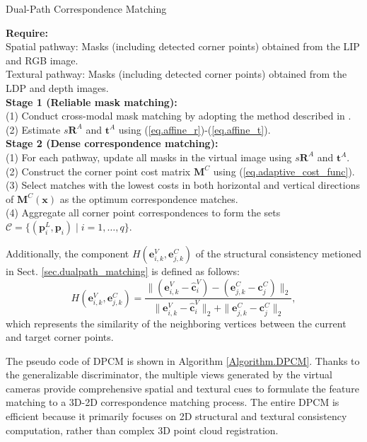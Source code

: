 \begin{algorithm}[t!]
\caption{Dual-Path Correspondence Matching}
\textbf{Require:}\\
Spatial pathway: Masks (including detected corner points) obtained from the LIP and RGB image. \\
Textural pathway: Masks (including detected corner points) obtained from the LDP and depth images.\\
\textbf{Stage 1 (Reliable mask matching):} \\
(1) Conduct cross-modal mask matching by adopting the method described in \cite{zhiwei2024lcec}. \\
(2) Estimate $s\boldsymbol{R}^A$ and $\boldsymbol{t}^A$ using (\ref{eq.affine_r})-(\ref{eq.affine_t}).\\
\textbf{Stage 2 (Dense correspondence matching):} \\
(1) For each pathway, update all masks in the virtual image using $s\boldsymbol{R}^A$ and $\boldsymbol{t}^A$.\\
(2) Construct the corner point cost matrix $\boldsymbol{M}^C$ using (\ref{eq.adaptive_cost_func}).
(3) Select matches with the lowest costs in both horizontal and vertical directions of $\boldsymbol{M}^{C}(\boldsymbol{x})$ as the optimum correspondence matches. \\
(4) Aggregate all corner point correspondences to form the sets $\mathcal{C} = \{(\boldsymbol{p}^L_i,\boldsymbol{p}_i) \mid i = 1,\dots, q\}$.
\label{Algorithm.DPCM}
\end{algorithm} 

Additionally, the component $H(\boldsymbol{e}^V_{i,k},\boldsymbol{e}^C_{j,k})$ of the structural consistency metioned in Sect. \ref{sec.dualpath_matching} is defined as follows:
\begin{equation}
H(\boldsymbol{e}^V_{i,k},\boldsymbol{e}^C_{j,k}) = {\frac{\| (\boldsymbol{e}^V_{i,k} - \hat{\boldsymbol{c}}^V_{i} ) -(\boldsymbol{e}^C_{j,k} - \boldsymbol{c}_j^C )\|_2}{\|  \boldsymbol{e}^V_{i,k} - \hat{\boldsymbol{c}}^V_{i}  \|_2 + \| \boldsymbol{e}^C_{j,k} - \boldsymbol{c}_j^C \|_2}},
\label{eq._struct_similarity}
\end{equation}
which represents the similarity of the neighboring vertices between the current and target corner points.

The pseudo code of DPCM is shown in Algorithm \ref{Algorithm.DPCM}. Thanks to the generalizable discriminator, the multiple views generated by the virtual cameras provide comprehensive spatial and textural cues to formulate the feature matching to a 3D-2D correspondence matching process. The entire DPCM is efficient because it primarily focuses on 2D structural and textural consistency computation, rather than complex 3D point cloud registration. 

